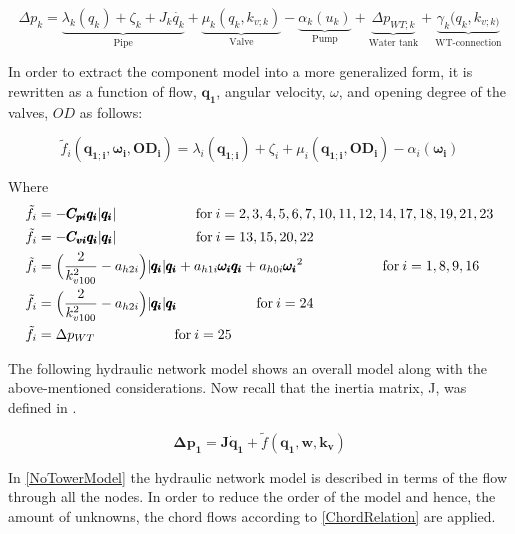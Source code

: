 \begin{equation}
\label{CompleteModel_extended}
\Delta p_k = \underbrace{\lambda_k (q_k) + \zeta_k + J_k \dot{q_k}}_\text{Pipe} + \underbrace{\mu_k (q_k, k_{v;k})}_\text{Valve} - \underbrace{\alpha_k(u_k)}_\text{Pump} + \underbrace{\Delta p_{WT;k}}_\text{Water tank} + \underbrace{\gamma_k (q_k, k_{v;k)}}_\text{WT-connection}
\end{equation}

In order to extract the component model into a more generalized form, it is rewritten as a function of flow, $\pmb{q_1}$, angular velocity, $\omega$, and opening degree of the valves, $OD$ as follows:

\begin{equation}
  \tilde{f}_i(\pmb{q_{1;i}}, \pmb{\omega_i}, \pmb{OD_i}) = \lambda_i(\pmb{q_{1;i}}) + \zeta_i + \mu_i(\pmb{q_{1;i}}, \pmb{OD_i}) - \alpha_i(\pmb{\omega_i})
  \label{ComponentFunction}
\end{equation}

Where\\
\begin{align}
\tilde{f}_i &= -\pmb{C_{pi} q_i} |\pmb{q_i}|  \hskip 2cm  \text{for}\: i = 2,3,4,5,6,7,10,11,12,14,17,18,19,21,23 \\
\tilde{f}_i &= -\pmb{C_{vi} q_i} |\pmb{q_i}|  \hskip 2cm  \text{for}\:i = 13,15,20,22\\
\tilde{f}_i &= \Big(\frac{2}{k_{v100}^2} - a_{h2i}\Big)|\pmb{q_i}| \pmb{q_i}  + a_{h1i} \pmb{\omega_{i}} \pmb{q_i} + a_{h0i}\pmb{{\omega_i}}^2 \hskip 2cm  \text{for}\: i = 1,8,9,16 \\
\tilde{f}_i &= \Big(\frac{2}{k_{v100}^2} - a_{h2i}\Big)|\pmb{q_i}| \pmb{q_i}  \hskip 2cm  \text{for}\: i = 24 \\
\tilde{f}_i &= \Delta p_{WT}  \hskip 2cm  \text{for}\:i = 25
\end{align}

The following hydraulic network model shows an overall model along with the above-mentioned considerations. 
Now recall that the inertia matrix, J, was defined in .

\begin{equation}
  \pmb{\Delta p_1} =  \pmb{J} \pmb{\dot{q}_1} + \tilde{f}(\pmb{q_1}, \pmb{w}, \pmb{k_v})
  \label{NoTowerModel}
\end{equation}

In \eqref{NoTowerModel} the hydraulic network model is described in terms of the 
flow through all the nodes. In order to reduce the order of the model and hence, 
the amount of unknowns, the chord flows according to \eqref{ChordRelation} are applied. 

